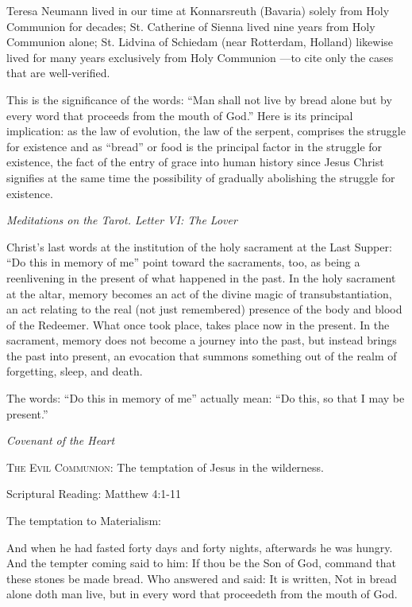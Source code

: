 \begin{quotationx}
Teresa Neumann lived in our time at Konnarsreuth (Bavaria) solely from Holy Communion for decades; St. Catherine of
Sienna lived nine years from Holy Communion alone; St. Lidvina of Schiedam (near Rotterdam, Holland) likewise lived for
many years exclusively from Holy Communion —to cite only the cases that are well-verified.

This is the significance of the words: “Man shall not live by bread alone but by every word that proceeds from the mouth
of God.” Here is its principal implication: as the law of evolution, the law of the serpent, comprises the struggle for
existence and as “bread” or food is the principal factor in the struggle for existence, the fact of the entry of grace
into human history since Jesus Christ signifies at the same time the possibility of gradually abolishing the struggle
for existence. \begin{flushright} \emph{Meditations on the Tarot. Letter VI: The Lover}\end{flushright}

\end{quotationx}
Christ's last words at the institution of the holy sacrament at the Last Supper: “Do this in memory
of me” point toward the sacraments, too, as being a reenlivening in the present of what happened in the past. In the
holy sacrament at the altar, memory becomes an act of the divine magic of transubstantiation, an act relating to the
real (not just remembered) presence of the body and blood of the Redeemer. What once took place, takes place now in the
present. In the sacrament, memory does not become a journey into the past, but instead brings the past into present, an
evocation that summons something out of the realm of forgetting, sleep, and death.

\begin{quotationx}
The words: “Do this in memory of me” actually mean: “Do this, so that I may be present.” \begin{flushright} \emph{Covenant of the
Heart}\end{flushright}

\end{quotationx}

\textsc{The Evil Communion:} The temptation of Jesus in the wilderness.

Scriptural Reading: Matthew 4:1-11

The temptation to Materialism:

\begin{quotationx}
And when he had fasted forty days and forty nights, afterwards he was hungry. And the tempter coming said to him: If
thou be the Son of God, command that these stones be made bread. Who answered and said: It is written, Not in bread
alone doth man live, but in every word that proceedeth from the mouth of God. 
\end{quotationx}


